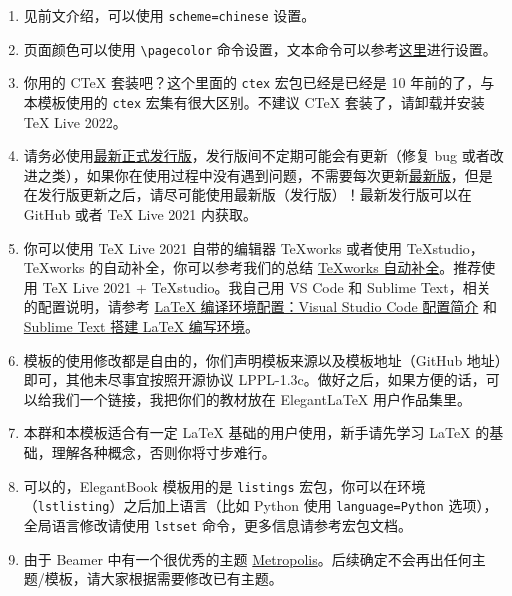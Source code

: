 \documentclass[lang=cn,newtx,10pt,scheme=chinese,pad,twocol]{zznote}
\begin{document}
\begin{enumerate}[itemsep=1.5ex]
	\item {}
	      见前文介绍，可以使用 \lstinline{scheme=chinese} 设置。
	\item {}
	      页面颜色可以使用 \lstinline{\pagecolor} 命令设置，文本命令可以参考\href{https://tex.stackexchange.com/questions/278544/xcolor-what-is-the-equivalent-of-default-text-color}{这里}进行设置。
	\item {}
	      你用的 C\TeX{} 套装吧？这个里面的 \lstinline{ctex} 宏包已经是已经是 10 年前的了，与本模板使用的 \lstinline{ctex} 宏集有很大区别。不建议 C\TeX{} 套装了，请卸载并安装 \TeX{} Live 2022。
	\item {}
	      请务必使用\href{https://github.com/ElegantLaTeX/ElegantBook/releases}{最新正式发行版}，发行版间不定期可能会有更新（修复 bug 或者改进之类），如果你在使用过程中没有遇到问题，不需要每次更新\href{https://github.com/ElegantLaTeX/ElegantBook/archive/master.zip}{最新版}，但是在发行版更新之后，请尽可能使用最新版（发行版）！最新发行版可以在 GitHub 或者 \TeX{} Live 2021 内获取。
	\item {}
	      你可以使用 \TeX{} Live 2021 自带的编辑器 \TeX{}works 或者使用 \TeX{}studio，\TeX works 的自动补全，你可以参考我们的总结 \href{https://github.com/EthanDeng/texworks-autocomplete}{\TeX works 自动补全}。推荐使用 \TeX{} Live 2021 + \TeX{}studio。我自己用 VS Code 和 Sublime Text，相关的配置说明，请参考 \href{https://github.com/EthanDeng/vscode-latex}{\LaTeX{} 编译环境配置：Visual Studio Code 配置简介} 和 \href{https://github.com/EthanDeng/sublime-text-latex}{Sublime Text 搭建 \LaTeX{} 编写环境}。
	\item {}
	      模板的使用修改都是自由的，你们声明模板来源以及模板地址（GitHub 地址）即可，其他未尽事宜按照开源协议 LPPL-1.3c。做好之后，如果方便的话，可以给我们一个链接，我把你们的教材放在 Elegant\LaTeX{} 用户作品集里。
	\item {}
	      本群和本模板适合有一定 \LaTeX{} 基础的用户使用，新手请先学习 \LaTeX{} 的基础，理解各种概念，否则你将寸步难行。
	\item {}
	      可以的，ElegantBook 模板用的是 \lstinline{listings} 宏包，你可以在环境（\lstinline{lstlisting}）之后加上语言（比如 Python 使用 \lstinline{language=Python} 选项），全局语言修改请使用 \lstinline{lstset} 命令，更多信息请参考宏包文档。
	\item {}
	      由于 Beamer 中有一个很优秀的主题 \href{https://github.com/matze/mtheme}{Metropolis}。后续确定不会再出任何主题/模板，请大家根据需要修改已有主题。
\end{enumerate}
\end{document}
